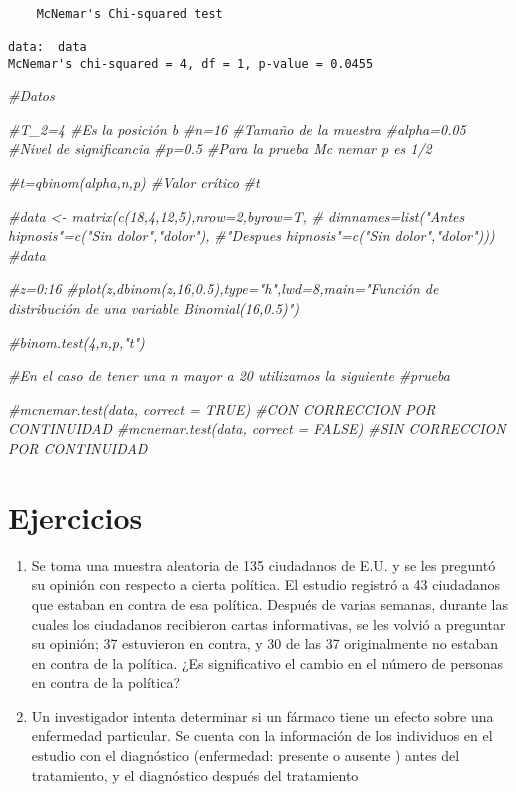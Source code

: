 \documentclass[a4paper,oneside,openany]{book}
\newenvironment{Shaded}{\begin{snugshade}}{\end{snugshade}}
\newcommand{\CommentTok}[1]{\textcolor[rgb]{0.56,0.35,0.01}{\textit{#1}}}
\begin{document}
\begin{verbatim}

    McNemar's Chi-squared test

data:  data
McNemar's chi-squared = 4, df = 1, p-value = 0.0455
\end{verbatim}

\begin{Shaded}
\begin{Highlighting}[]
\CommentTok{#Datos}

\CommentTok{#T_2=4                    #Es la posición b}
\CommentTok{#n=16                     #Tamaño de la muestra}
\CommentTok{#alpha=0.05               #Nivel de significancia}
\CommentTok{#p=0.5                    #Para la prueba Mc nemar p es 1/2}


\CommentTok{#t=qbinom(alpha,n,p)     #Valor crítico}
\CommentTok{#t}


\CommentTok{#data <- matrix(c(18,4,12,5),nrow=2,byrow=T, }
      \CommentTok{# dimnames=list("Antes hipnosis"=c("Sin dolor","dolor"), }
       \CommentTok{#"Despues hipnosis"=c("Sin dolor","dolor")))}
\CommentTok{#data}

\CommentTok{#z=0:16}
\CommentTok{#plot(z,dbinom(z,16,0.5),type="h",lwd=8,main="Función de distribución de una variable Binomial(16,0.5)")}

\CommentTok{#binom.test(4,n,p,"t")}


\CommentTok{#En el caso de tener una n mayor a 20 utilizamos la siguiente}
\CommentTok{#prueba}


\CommentTok{#mcnemar.test(data, correct = TRUE) #CON CORRECCION POR CONTINUIDAD}
\CommentTok{#mcnemar.test(data, correct = FALSE) #SIN CORRECCION POR CONTINUIDAD}
\end{Highlighting}
\end{Shaded}

\section{Ejercicios}\label{ejercicios-3}

\begin{enumerate}
\def\labelenumi{\arabic{enumi}.}
\item
  Se toma una muestra aleatoria de 135 ciudadanos de E.U. y se les
  preguntó su opinión con respecto a cierta política. El estudio
  registró a 43 ciudadanos que estaban en contra de esa política.
  Después de varias semanas, durante las cuales los ciudadanos
  recibieron cartas informativas, se les volvió a preguntar su opinión;
  37 estuvieron en contra, y 30 de las 37 originalmente no estaban en
  contra de la política. ¿Es significativo el cambio en el número de
  personas en contra de la política?
\item
  Un investigador intenta determinar si un fármaco tiene un efecto sobre
  una enfermedad particular. Se cuenta con la información de los
  individuos en el estudio con el diagnóstico (enfermedad: presente o
  ausente ) antes del tratamiento, y el diagnóstico después del
  tratamiento
\end{enumerate}
\end{document}
